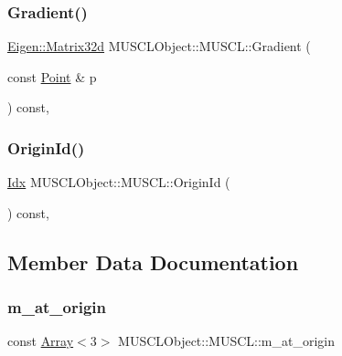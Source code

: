 \subsubsection{\texorpdfstring{Gradient()}{Gradient()}}
{\footnotesize\ttfamily \hyperlink{namespaceEigen_a4bc13f7bc164b152307bec23b85f81ab}{Eigen\+::\+Matrix32d} M\+U\+S\+C\+L\+Object\+::\+M\+U\+S\+C\+L\+::\+Gradient (\begin{DoxyParamCaption}\item[{const \hyperlink{PointOperations_8h_a71a59e5a162c0274a9af106af82cf198}{Point} \&}]{p }\end{DoxyParamCaption}) const\hspace{0.3cm}{\ttfamily [inline]}, {\ttfamily [noexcept]}}

\mbox{\label{structMUSCLObject_1_1MUSCL_a9771d52697018e7ac21f7efda3b83cfa}} 
\subsubsection{\texorpdfstring{Origin\+Id()}{OriginId()}}
{\footnotesize\ttfamily \hyperlink{Includes_8h_ae78891cd308078a2f5f9e7193065c805}{Idx} M\+U\+S\+C\+L\+Object\+::\+M\+U\+S\+C\+L\+::\+Origin\+Id (\begin{DoxyParamCaption}{ }\end{DoxyParamCaption}) const\hspace{0.3cm}{\ttfamily [inline]}, {\ttfamily [noexcept]}}



\subsection{Member Data Documentation}
\mbox{\label{structMUSCLObject_1_1MUSCL_a2a28a09ef55efc3171e7383e7e362bbf}} 
\subsubsection{\texorpdfstring{m\+\_\+at\+\_\+origin}{m\_at\_origin}}
{\footnotesize\ttfamily const \hyperlink{Includes_8h_abd9de33944f934950000c3929e14ad8d}{Array}$<$3$>$ M\+U\+S\+C\+L\+Object\+::\+M\+U\+S\+C\+L\+::m\+\_\+at\+\_\+origin\hspace{0.3cm}{\ttfamily [private]}}

